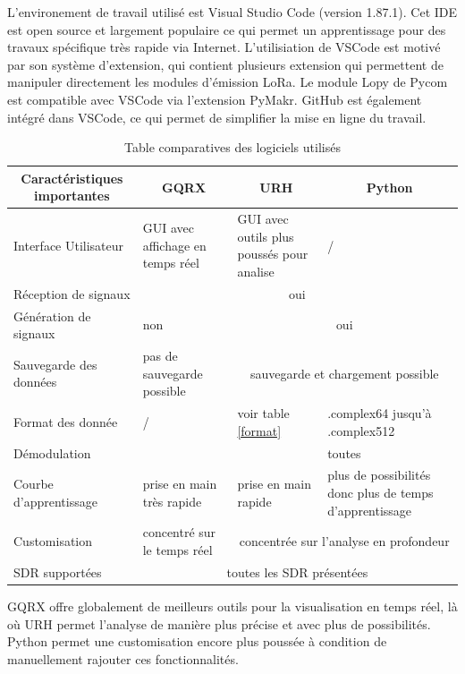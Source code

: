 \newpage

L'environement de travail utilisé est Visual Studio Code (version 1.87.1). Cet IDE est open source et largement populaire ce qui permet un apprentissage pour des travaux spécifique très rapide via Internet. L'utilisiation de VSCode est motivé par son système d'extension, qui contient plusieurs extension qui permettent de manipuler directement les modules d'émission LoRa. Le module Lopy de Pycom est compatible avec VSCode via l'extension PyMakr. GitHub est également intégré dans VSCode, ce qui permet de simplifier la mise en ligne du travail.

\begin{table}[h]
\centering
\begin{tabular}{|p{4cm}|p{2cm}|p{2cm}|p{3.5cm}|}
\hline
\multicolumn{1}{|c|}{Caractéristiques importantes} & \multicolumn{1}{c|}{GQRX} & \multicolumn{1}{c|}{URH} & \multicolumn{1}{c|}{Python}\\
\hline
Interface Utilisateur & GUI avec affichage en temps réel & GUI avec outils plus poussés pour analise & / \\
\hline
Réception de signaux & \multicolumn{3}{c|}{oui} \\
\hline
Génération de signaux & non & \multicolumn{2}{c|}{oui} \\
\hline
Sauvegarde des données & pas de sauvegarde possible & \multicolumn{2}{c|}{sauvegarde et chargement possible} \\
\hline
Format des donnée & / & voir table \ref{format} & .complex64 jusqu'à .complex512 \\
\hline
Démodulation &  &  & toutes\\
\hline
Courbe d'apprentissage & prise en main très rapide & prise en main rapide & plus de possibilités donc plus de temps d'apprentissage \\
\hline
Customisation & concentré sur le temps réel & \multicolumn{2}{c|}{concentrée sur l'analyse en profondeur} \\
\hline
SDR supportées & \multicolumn{3}{c|}{toutes les SDR présentées} \\
\hline
\end{tabular}
\caption{Table comparatives des logiciels utilisés}
\label{table2}
\end{table}

GQRX offre globalement de meilleurs outils pour la visualisation en temps réel, là où URH permet l'analyse de manière plus précise et avec plus de possibilités. Python permet une customisation encore plus poussée à condition de manuellement rajouter ces fonctionnalités.

